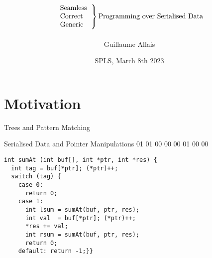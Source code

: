 \documentclass{beamer}
\title{
  \[
  \left.
    \begin{tabular}{l}
      Seamless \\
      Correct \\
      Generic
    \end{tabular}
  \right\}
  \text{Programming over Serialised Data}
  \]}
\author{Guillaume Allais}
\institute{University of St Andrews}
\date{SPLS, March 8th 2023}
\newenvironment{hexdump}{\medskip\ttfamily\obeyspaces\obeylines\noindent}{\medskip}
\newcommand{\hexadata}[1]{\texttt{\IdrisData{#1}}}
\begin{document}
\begin{frame}
  \maketitle
\end{frame}

\section{Motivation}

\newcommand{\mknode}[3]{\draw (#1,#2)  circle (.27cm) node[align=center] {\IdrisData{#3}};}
\newcommand{\mkleaf}[2]{\draw[fill=black] (#1,#2) node[align=center] {} +(-.1cm,-.1cm) rectangle +(.1cm,.1cm);}

\begin{frame}{Trees and Pattern Matching}
\begin{minipage}{.5\textwidth}
\end{minipage}\hfill
\begin{minipage}{.45\textwidth}
\end{minipage}
\end{frame}

\begin{frame}[fragile]{Serialised Data and Pointer Manipulations}
\begin{hexdump}
01 01 01 00 \hexadata{01} 00 \hexadata{05} 00 \hexadata{0a} 01 00 \hexadata{14} 00
\end{hexdump}

\begin{lstlisting}
int sumAt (int buf[], int *ptr, int *res) {
  int tag = buf[*ptr]; (*ptr)++;
  switch (tag) {
    case 0:
      return 0;
    case 1:
      int lsum = sumAt(buf, ptr, res);
      int val  = buf[*ptr]; (*ptr)++;
      *res += val;
      int rsum = sumAt(buf, ptr, res);
      return 0;
    default: return -1;}}
\end{lstlisting}
\end{frame}
\end{document}
